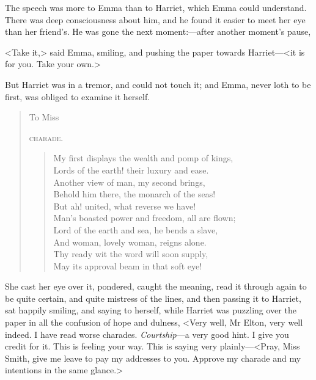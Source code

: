 The speech was more to Emma than to Harriet, which Emma could understand. There was deep consciousness about him, and he found it easier to meet her eye than her friend's. He was gone the next moment:—after another moment's pause,

<Take it,> said Emma, smiling, and pushing the paper towards Harriet—<it is for you. Take your own.>

But Harriet was in a tremor, and could not touch it; and Emma, never loth to be first, was obliged to examine it herself.

\begin{quotation}
To Miss\doubleemdash 

\textsc{charade.}

\begin{verse}
\begin{altverse}
My first displays the wealth and pomp of kings,\\
    Lords of the earth! their luxury and ease.\\
Another view of man, my second brings,\\
    Behold him there, the monarch of the seas!\\

But ah! united, what reverse we have!\\
    Man's boasted power and freedom, all are flown;\\
Lord of the earth and sea, he bends a slave,\\
    And woman, lovely woman, reigns alone.\\

    Thy ready wit the word will soon supply,\\
    May its approval beam in that soft eye!\\
\end{altverse}
\end{verse}
\end{quotation}

She cast her eye over it, pondered, caught the meaning, read it through again to be quite certain, and quite mistress of the lines, and then passing it to Harriet, sat happily smiling, and saying to herself, while Harriet was puzzling over the paper in all the confusion of hope and dulness, <Very well, Mr Elton, very well indeed. I have read worse charades. \textit{Courtship}—a very good hint. I give you credit for it. This is feeling your way. This is saying very plainly—<Pray, Miss Smith, give me leave to pay my addresses to you. Approve my charade and my intentions in the same glance.>


